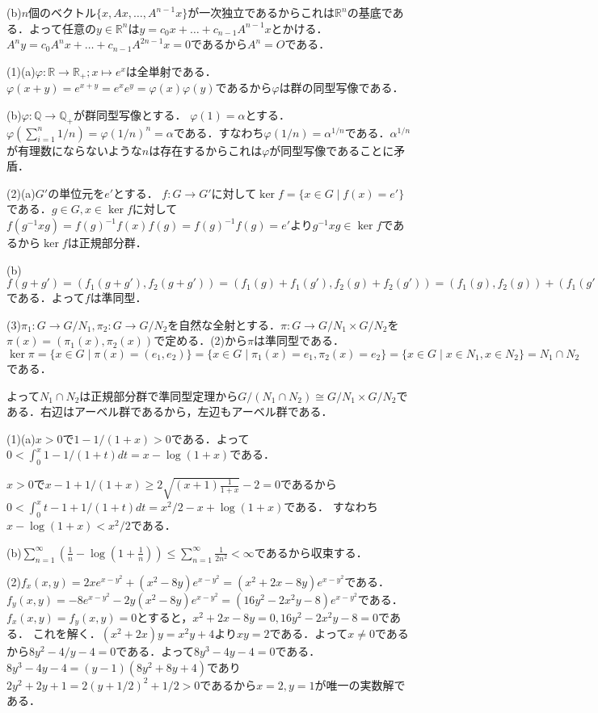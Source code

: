 \documentclass[
		book,
		head_space=20mm,
		foot_space=20mm,
		gutter=10mm,
		line_length=190mm
]{jlreq}
\begin{document}
(b)$n$個のベクトル$\{x,Ax,\dots,A^{n-1}x\}$が一次独立であるからこれは$\mathbb{R}^n$の基底である．よって任意の$y \in \mathbb{R}^n$は$y=c_0x+\dots+c_{n-1}A^{n-1}x$とかける．$A^ny=c_0A^nx+\dots+c_{n-1}A^{2n-1}x=0$であるから$A^n=O$である．

(1)(a)$\varphi\colon \mathbb{R}\rightarrow \mathbb{R}_+;x\mapsto e^x$は全単射である．$\varphi(x+y)=e^{x+y}=e^xe^y=\varphi(x)\varphi(y)$であるから$\varphi$は群の同型写像である．

(b)$\varphi\colon \mathbb{Q} \rightarrow \mathbb{Q}_+$が群同型写像とする．
$\varphi(1)=\alpha$とする．$\varphi(\sum\limits_{i=1}^n 1/n)=\varphi(1/n)^n=\alpha$である．すなわち$\varphi(1/n)=\alpha^{1/n}$である．$\alpha^{1/n}$が有理数にならないような$n$は存在するからこれは$\varphi$が同型写像であることに矛盾．

(2)(a)$G'$の単位元を$e'$とする．
$f \colon G \rightarrow G'$に対して$\ker f= \{ x\in G \mid f(x)=e'\}$である．$g \in G,x \in \ker f$に対して$f(g^{-1}xg)=f(g)^{-1}f(x)f(g)=f(g)^{-1}f(g)=e'$より$g^{-1}xg \in \ker f$であるから$\ker f$は正規部分群．

(b)$f(g+g')=(f_1(g+g'),f_2(g+g'))=(f_1(g)+f_1(g'),f_2(g)+f_2(g'))=(f_1(g),f_2(g))+(f_1(g'),f_2(g'))=f(g)+f(g')$である．よって$f$は準同型．

(3)$\pi_1 \colon G \rightarrow G/N_1,\pi_2 \colon G \rightarrow G/N_2$を自然な全射とする．$\pi \colon G \rightarrow G/N_1 \times G/N_2$を$\pi(x)=(\pi_1(x),\pi_2(x))$で定める．(2)から$\pi$は準同型である．$\ker \pi =\{ x \in G \mid \pi(x)=(e_1,e_2)\}=\{ x \in G \mid \pi_1(x)=e_1,\pi_2(x)=e_2\}=\{ x \in G \mid x \in N_1,x \in N_2\}=N_1 \cap N_2$である．

よって$N_1 \cap N_2$は正規部分群で準同型定理から$G/(N_1 \cap N_2)\cong G/N_1 \times G/N_2$である．右辺はアーベル群であるから，左辺もアーベル群である．

(1)(a)$x>0$で$1-1/(1+x)>0$である．よって$0<\int_0^x 1-1/(1+t)dt=x-\log(1+x)$である．

$x>0$で$x-1+1/(1+x) \ge 2\sqrt{(x+1)\frac{1}{1+x}}-2=0$であるから$0<\int_0^x t-1+1/(1+t)dt=x^2/2-x+\log(1+x)$である．
すなわち$x-\log(1+x)<x^2/2$である．

(b)$\sum\limits_{n=1}^\infty (\frac{1}{n}-\log(1+\frac{1}{n}))\le \sum\limits_{n=1}^\infty \frac{1}{2n^2}<\infty$であるから収束する．

(2)$f_x(x,y)=2xe^{x-y^2}+(x^2-8y)e^{x-y^2}=(x^2+2x-8y)e^{x-y^2}$である．$f_y(x,y)=-8e^{x-y^2}-2y(x^2-8y)e^{x-y^2}=(16y^2-2x^2y-8)e^{x-y^2}$である．
$f_x(x,y)=f_y(x,y)=0$とすると，$x^2+2x-8y=0,16y^2-2x^2y-8=0$である．
これを解く．$(x^2+2x)y=x^2y+4$より$xy=2$である．よって$x\neq 0$であるから$8y^2-4/y-4=0$である．よって$8y^3-4y-4=0$である．$8y^3-4y-4=(y-1)(8y^2+8y+4)$であり$2y^2+2y+1=2(y+1/2)^2+1/2>0$であるから$x=2,y=1$が唯一の実数解である．
\end{document}
